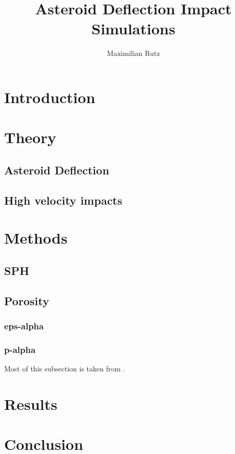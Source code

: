 \documentclass{article}
\title{Asteroid Deflection Impact Simulations}
\author{Maximilian Rutz}
\date{}
\begin{document}
	\maketitle
	\begin{abstract}
	 
	\end{abstract}
	
	\newpage
	\tableofcontents
	 
	\newpage
	\section{Introduction} 
	\section{Theory}
		\subsection{Asteroid Deflection}
		\subsection{High velocity impacts}
	\section{Methods}
		\subsection{SPH}
		\subsection{Porosity}
		\subsubsection{eps-alpha}
		\subsubsection{p-alpha}
		Most of this subsection is taken from \cite{Jutzi_p_alpha_1}.		 
	\section{Results}
	\section{Conclusion}
	
	\newpage 
	\printbibliography
 
\end{document}
